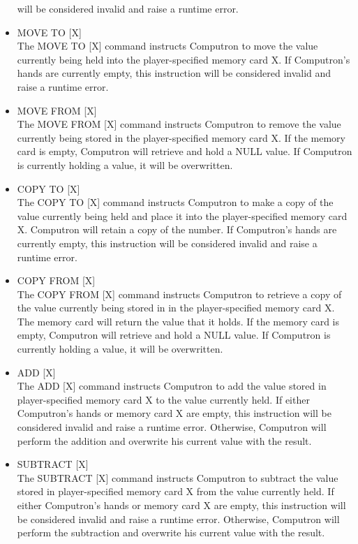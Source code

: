 \begin{itemize}
           will be considered invalid and raise a runtime error.
	\item MOVE TO [X]\\
	The MOVE TO [X] command instructs Computron to move the value currently being 
	held into the player-specified memory card X. If Computron's hands are currently empty, this 
	instruction will be considered invalid and raise a runtime error.
	\item MOVE FROM [X]\\
	The MOVE FROM [X] command instructs Computron to remove the value currently being 
	stored in the player-specified memory card X. If the memory card is empty, Computron will retrieve 
	and hold a NULL value. If Computron is currently holding a value, it will be overwritten.
	\item COPY TO [X]\\
	The COPY TO [X] command instructs Computron to make a copy of the value currently being held 
	and place it into the player-specified memory card X. Computron will retain a copy of the number. If 
	Computron's hands are currently empty, this instruction will be considered invalid and raise a 
	runtime error.
	\item COPY FROM [X]\\
	The COPY FROM [X] command instructs Computron to retrieve a copy of the value currently 
	being stored in in the player-specified memory card X. The memory card will return the value that
	it holds. If the memory card is empty, Computron will retrieve and hold a NULL value. If Computron 
	is currently holding a value, it will be overwritten.
	\item ADD [X]\\
	The ADD [X] command instructs Computron to add the value stored in player-specified 
	memory card X to the value currently held. If either Computron's hands or memory card X are empty, this 
	instruction will be considered invalid and raise a runtime error. Otherwise, Computron will 
	perform the addition and overwrite his current value with the result.
	\item SUBTRACT [X]\\
	The SUBTRACT [X] command instructs Computron to subtract the value stored in 
	player-specified memory card X from the value currently held. If either Computron's hands or 
	memory card X are empty, this instruction will be considered invalid and raise a runtime error. 
	Otherwise, Computron will perform the subtraction and overwrite his current value with the result.
\end{itemize}

